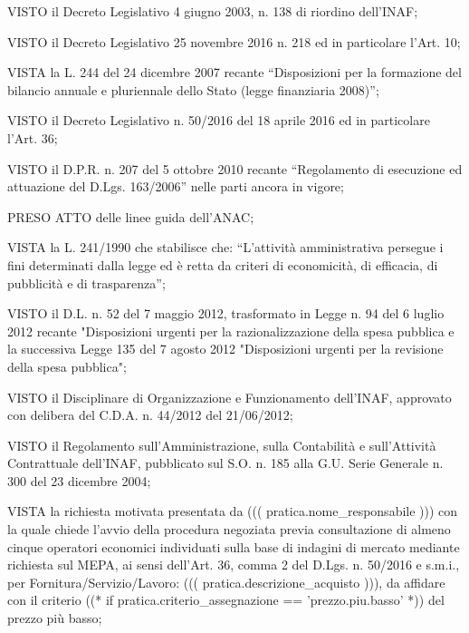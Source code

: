 \documentclass[a4paper,12pt]{letter}
\begin{document}
\begin{list}{VALUTATA}{}
\item[VISTO] il Decreto Legislativo 4 giugno 2003, n. 138 di riordino dell'INAF;
\item[VISTO] il Decreto Legislativo 25 novembre 2016 n. 218 ed in particolare l'Art. 10;
\item[VISTA] la L. 244 del 24 dicembre 2007 recante ``Disposizioni per la formazione 
        del bilancio annuale e pluriennale dello Stato (legge finanziaria 2008)''; 
\item[VISTO]  il Decreto Legislativo n. 50/2016 del 18 aprile 2016 ed in particolare
      l'Art. 36;
\item[VISTO] il D.P.R. n. 207 del 5 ottobre 2010 recante ``Regolamento di esecuzione 
        ed attuazione del D.Lgs. 163/2006'' nelle parti ancora in vigore; 
\item[PRESO ATTO] delle linee guida dell'ANAC;
\item[VISTA] la L. 241/1990 che stabilisce che: ``L'attivit\`a amministrativa persegue i 
        fini determinati dalla legge ed \`e retta da criteri di economicit\`a, di 
        efficacia, di pubblicit\`a e di trasparenza'';
\item[VISTO] il D.L. n. 52 del 7 maggio 2012, trasformato in Legge n. 94 del 6 luglio 2012 
        recante "Disposizioni urgenti per la razionalizzazione della spesa pubblica 
        e la successiva Legge 135 del 7 agosto 2012 "Disposizioni urgenti per la 
        revisione della spesa pubblica"; 
\item[VISTO] il Disciplinare di Organizzazione e Funzionamento dell'INAF, approvato
        con delibera del C.D.A. n. 44/2012 del 21/06/2012;
\item[VISTO] il Regolamento sull'Amministrazione, sulla Contabilit\`a e sull'Attivit\`a 
        Contrattuale dell'INAF, pubblicato sul S.O. n. 185 alla G.U. Serie Generale 
        n. 300 del 23 dicembre 2004;   
\item[VISTA] la richiesta motivata presentata da ((( pratica.nome_responsabile )))
        con la quale chiede l'avvio della procedura negoziata previa consultazione
        di almeno cinque operatori economici individuati sulla base di indagini di 
        mercato mediante richiesta sul MEPA, ai sensi dell'Art. 36, comma 2 del
        D.Lgs. n. 50/2016 e s.m.i., per Fornitura/Servizio/Lavoro: ((( pratica.descrizione_acquisto ))),
        da affidare con il criterio %
   ((* if pratica.criterio_assegnazione == 'prezzo.piu.basso' *)) %
del prezzo pi\`u basso;

\end{list}
\end{document}
